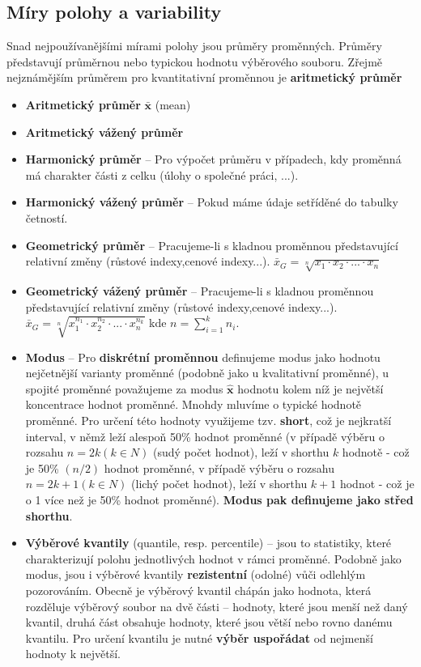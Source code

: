 \subsection{Míry polohy a variability}
Snad nejpoužívanějšími mírami polohy jsou průměry proměnných. Průměry představují průměrnou nebo typickou hodnotu výběrového souboru. Zřejmě nejznámějším průměrem pro kvantitativní proměnnou je \textbf{aritmetický průměr}
\begin{itemize}
	\item \textbf{Aritmetický průměr} $\mathbf{\bar{x}}$ (mean)
	\item \textbf{Aritmetický vážený průměr}
	\item \textbf{Harmonický průměr}  -- Pro výpočet průměru v případech, kdy proměnná má charakter části z celku (úlohy o společné práci, ...).
	\item \textbf{Harmonický vážený průměr} -- Pokud máme údaje setříděné do tabulky četností.
	\item \textbf{Geometrický průměr} -- Pracujeme-li s kladnou proměnnou představující relativní změny (růstové indexy,cenové indexy...). $\bar{x}_G = \sqrt[n]{x_1 \cdot x_2 \cdot ... \cdot x_n}$
	\item \textbf{Geometrický vážený průměr} -- Pracujeme-li s kladnou proměnnou představující relativní změny (růstové indexy,cenové indexy...). $\bar{x}_G = \sqrt[n]{x_1^{n_1} \cdot x_2^{n_2} \cdot ... \cdot x_n^{n_k}}$ kde $n = \sum\limits_{i=1}^k n_i$. \\

	\item \textbf{Modus} -- Pro \textbf{diskrétní proměnnou} definujeme modus jako hodnotu nejčetnější varianty proměnné (podobně jako u kvalitativní proměnné), u spojité proměnné považujeme za modus $\mathbf{\hat{x}}$ hodnotu kolem níž je největší koncentrace hodnot proměnné. Mnohdy mluvíme o typické hodnotě proměnné. Pro určení této hodnoty využijeme tzv. \textbf{short}, což je nejkratší interval, v němž leží alespoň 50\% hodnot proměnné (v případě výběru o rozsahu $n = 2k(k \in N)$ (sudý počet hodnot), leží v shorthu $k$ hodnotě - což je 50\% $(n/2)$ hodnot proměnné, v případě výběru o rozsahu $n = 2k + 1(k \in N)$ (lichý počet hodnot), leží v shorthu $k + 1$ hodnot - což je o 1 více než je 50\% hodnot proměnné). \textbf{Modus pak definujeme jako střed shorthu}. \\

	\item \textbf{Výběrové kvantily} (quantile, resp. percentile) -- jsou to statistiky, které charakterizují polohu jednotlivých hodnot v rámci proměnné. Podobně jako modus, jsou i výběrové kvantily \textbf{rezistentní} (odolné) vůči odlehlým pozorováním. Obecně je výběrový kvantil chápán jako hodnota, která rozděluje výběrový soubor na dvě části -- hodnoty, které jsou menší než daný kvantil, druhá část obsahuje hodnoty, které jsou větší nebo rovno danému kvantilu. Pro určení kvantilu je nutné \textbf{výběr uspořádat} od nejmenší hodnoty k největší. \\


\end{itemize}
